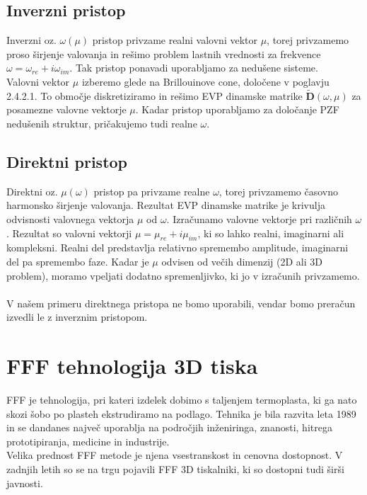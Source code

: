 \documentclass[12pt]{report}
\begin{document}
\subsection{Inverzni pristop}
Inverzni oz. $\omega(\mu)$ pristop privzame realni valovni vektor $\mu$, torej privzamemo proso širjenje valovanja in rešimo problem lastnih vrednosti za frekvence $\omega = \omega_{re} + i\omega_{im}$. Tak pristop ponavadi 
uporabljamo za nedušene sisteme. \cite{vanbelle} \\
Valovni vektor $\mu$ izberemo glede na Brillouinove cone, določene v poglavju 2.4.2.1. To območje diskretiziramo in rešimo \ac{EVP} dinamske matrike $\mathbf{\widetilde{D}}(\omega, \mu)$ za posamezne valovne vektorje $\mu$.
Kadar pristop uporabljamo za določanje \ac{PZF} nedušenih struktur, pričakujemo tudi realne $\omega$. \cite{kosir}

\subsection{Direktni pristop}
Direktni oz. $\mu(\omega)$ pristop pa privzame realne $\omega$, torej privzamemo časovno harmonsko širjenje valovanja. Rezultat \ac{EVP} dinamske matrike je krivulja odvisnosti valovnega vektorja $\mu$
od $\omega$. Izračunamo valovne vektorje pri različnih $\omega$. Rezultat so valovni vektorji $\mu = \mu_{re} + i\mu_{im}$, ki so lahko realni, imaginarni ali kompleksni. Realni del predstavlja relativno spremembo amplitude, imaginarni del pa
spremembo faze. \cite{vanbelle, kosir} Kadar je $\mu$ odvisen od večih dimenzij (2D ali 3D problem), moramo vpeljati dodatno spremenljivko, ki jo v izračunih privzamemo.
\\
\\
V našem primeru direktnega pristopa ne bomo uporabili, vendar bomo preračun izvedli le z inverznim pristopom.

\section{FFF tehnologija 3D tiska}
\ac{FFF} je tehnologija, pri kateri izdelek dobimo s taljenjem termoplasta, ki ga nato skozi šobo po plasteh ekstrudiramo na podlago. Tehnika je bila razvita leta 1989 in se dandanes
največ uporablja na področjih inženiringa, znanosti, hitrega prototipiranja, medicine in industrije. \cite{fff_article}
\\
Velika prednost \ac{FFF} metode je njena vsestranskost in cenovna dostopnost. V zadnjih letih so se na trgu pojavili \ac{FFF} 3D tiskalniki, ki so dostopni tudi 
širši javnosti. 
\end{document}
